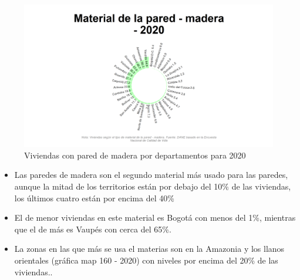     \begin{figure}[H]
        \caption{Viviendas con pared de madera por departamentos para 2020 \label{map_result_2} }
        \begin{center}
        \includegraphics[width=\textwidth,keepaspectratio]{img/var_160_static.png}
        \end{center}
    \end{figure}
            \begin{itemize}
                    \item Las paredes de madera son el segundo material más usado para las paredes, aunque la mitad de los territorios están por debajo del 10\% de las viviendas, los últimos cuatro están por encima del 40\%
                    \item El de menor viviendas en este material es Bogotá con menos del 1\%, mientras que el de más es Vaupés con cerca del 65\%.
                    \item La zonas en las que más se usa el materias son en la Amazonia y los llanos orientales (gráfica map 160 - 2020) con niveles por encima del 20\% de las viviendas..
                    \end{itemize}

